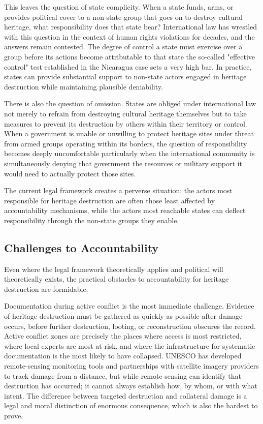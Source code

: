 This leaves the question of state complicity. When a state funds, arms, or provides political cover to a non-state group that goes on to destroy cultural heritage, what responsibility does that state bear? International law has wrestled with this question in the context of human rights violations for decades, and the answers remain contested. The degree of control a state must exercise over a group before its actions become attributable to that state the so-called "effective control" test established in the Nicaragua case  sets a very high bar. In practice, states can provide substantial support to non-state actors engaged in heritage destruction while maintaining plausible deniability.

There is also the question of omission. States are obliged under international law not merely to refrain from destroying cultural heritage themselves but to take measures to prevent its destruction by others within their territory or control. When a government is unable or unwilling to protect heritage sites under threat from armed groups operating within its borders, the question of responsibility becomes deeply uncomfortable particularly when the international community is simultaneously denying that government the resources or military support it would need to actually protect those sites.

The current legal framework creates a perverse situation: the actors most responsible for heritage destruction are often those least affected by accountability mechanisms, while the actors most reachable states can deflect responsibility through the non-state groups they enable.

\subsection{Challenges to Accountability}

Even where the legal framework theoretically applies and political will theoretically exists, the practical obstacles to accountability for heritage destruction are formidable.

Documentation during active conflict is the most immediate challenge. Evidence of heritage destruction must be gathered as quickly as possible after damage occurs, before further destruction, looting, or reconstruction obscures the record. Active conflict zones are precisely the places where access is most restricted, where local experts are most at risk, and where the infrastructure for systematic documentation is the most likely to have collapsed. UNESCO has developed remote-sensing monitoring tools and partnerships with satellite imagery providers to track damage from a distance, but while remote sensing can identify that destruction has occurred; it cannot always establish how, by whom, or with what intent. The difference between targeted destruction and collateral damage is a legal and moral distinction of enormous consequence, which is also the hardest to prove.

